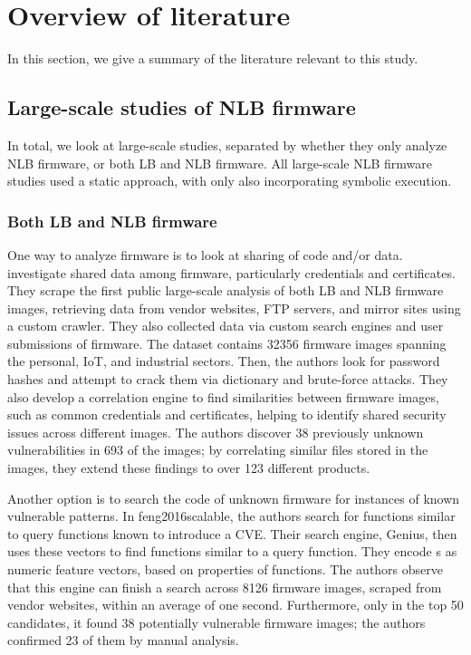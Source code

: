 \section{Overview of literature}\label{s:overview of literature}
In this section, we give a summary of the literature relevant to this study.

\subsection{Large-scale studies of NLB firmware}
In total, we look at  large-scale studies, separated by whether they only analyze NLB firmware, or both LB and NLB firmware.
All large-scale NLB firmware studies used a static approach, with only  also incorporating symbolic execution.

\subsubsection{Both LB and NLB firmware}
One way to analyze firmware is to look at sharing of code and/or data.
 investigate shared data among firmware, particularly credentials and certificates.
They scrape the first public large-scale analysis of both LB and NLB firmware images, retrieving data from vendor websites, FTP servers, and mirror sites using a custom crawler.
They also collected data via custom search engines and user submissions of firmware.
The dataset contains \num{32356} firmware images spanning the personal, IoT, and industrial sectors.
Then, the authors look for password hashes and attempt to crack them via dictionary and brute-force attacks.
They also develop a correlation engine to find similarities between firmware images, such as common credentials and certificates, helping to identify shared security issues across different images.
The authors discover \num{38} previously unknown vulnerabilities in \num{693} of the images; by correlating similar files stored in the images, they extend these findings to over \num{123} different products.

Another option is to search the code of unknown firmware for instances of known vulnerable patterns.
In \citet{Scalable graph-based bug search}{feng2016scalable}, the authors search for functions similar to query functions known to introduce a CVE.
Their search engine, Genius, then uses these vectors to find functions similar to a query function.
They encode s as numeric feature vectors, based on properties of functions.
The authors observe that this engine can finish a search across \num{8126} firmware images, scraped from vendor websites, within an average of one second.
Furthermore, only in the top \num{50} candidates, it found \num{38} potentially vulnerable firmware images; the authors confirmed \num{23} of them by manual analysis.

